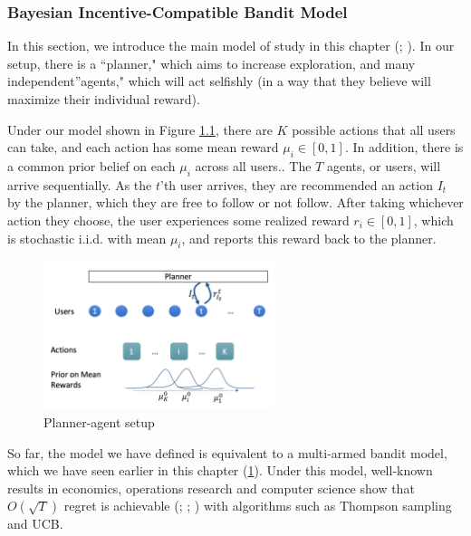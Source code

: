 \documentclass[
  letterpaper,
  DIV=11,
  numbers=noendperiod,
  oneside]{scrreprt}
\theoremstyle{remark}
\begin{document}
\subsubsection*{Bayesian Incentive-Compatible Bandit
Model}\label{bayesian-incentive-compatible-bandit-model}

In this section, we introduce the main model of study in this chapter
(;
). In our setup, there is a ``planner," which aims to
increase exploration, and many independent''agents," which will act
selfishly (in a way that they believe will maximize their individual
reward).

Under our model shown in Figure \hyperref[fig:planner-agent]{1.1}, there
are \(K\) possible actions that all users can take, and each action has
some mean reward \(\mu_i \in [0, 1]\). In addition, there is a common
prior belief on each \(\mu_i\) across all users.. The \(T\) agents, or
users, will arrive sequentially. As the \(t\)'th user arrives, they are
recommended an action \(I_t\) by the planner, which they are free to
follow or not follow. After taking whichever action they choose, the
user experiences some realized reward \(r_i \in [0, 1]\), which is
stochastic i.i.d. with mean \(\mu_i\), and reports this reward back to
the planner.

\begin{figure}

{\centering \includegraphics[width=0.6\textwidth,height=\textheight]{src/Figures/planner-agent-setup.png}

}

\caption{Planner-agent setup}

\end{figure}%

So far, the model we have defined is equivalent to a multi-armed bandit
model, which we have seen earlier in this chapter
(\hyperref[4optim]{1}). Under this model, well-known results in
economics, operations research and computer science show that
\(O(\sqrt{T})\) regret is achievable
(; ; ) with algorithms such as Thompson sampling and UCB.
\end{document}
